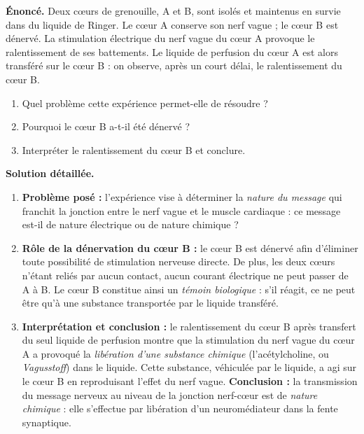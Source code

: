 \documentclass[11pt]{article}
\newcounter{popsec}
\newcounter{popsub}
\newcommand{\courssub}[1]{%
  \stepcounter{popsub}%
  \par\vspace{9pt}\noindent{\popxbold\fontsize{11.5}{13}\selectfont\color{popink}{\color{poporange}\thepopsec.\thepopsub}\hspace{6pt}#1}\par\nopagebreak\vspace{4pt}
}
\begin{document}
\courssub{Exercice résolu}

\begin{exoresolu}
\textbf{Énoncé.} Deux cœurs de grenouille, A et B, sont isolés et maintenus en survie dans du liquide de Ringer. Le cœur A conserve son nerf vague ; le cœur B est dénervé. La stimulation électrique du nerf vague du cœur A provoque le ralentissement de ses battements. Le liquide de perfusion du cœur A est alors transféré sur le cœur B : on observe, après un court délai, le ralentissement du cœur B.
\begin{enumerate}
\item Quel problème cette expérience permet-elle de résoudre ?
\item Pourquoi le cœur B a-t-il été dénervé ?
\item Interpréter le ralentissement du cœur B et conclure.
\end{enumerate}
\tcblower
\textbf{Solution détaillée.}
\begin{enumerate}
\item \textbf{Problème posé :} l'expérience vise à déterminer la \emph{nature du message} qui franchit la jonction entre le nerf vague et le muscle cardiaque : ce message est-il de nature électrique ou de nature chimique ?
\item \textbf{Rôle de la dénervation du cœur B :} le cœur B est dénervé afin d'éliminer toute possibilité de stimulation nerveuse directe. De plus, les deux cœurs n'étant reliés par aucun contact, aucun courant électrique ne peut passer de A à B. Le cœur B constitue ainsi un \emph{témoin biologique} : s'il réagit, ce ne peut être qu'à une substance transportée par le liquide transféré.
\item \textbf{Interprétation et conclusion :} le ralentissement du cœur B après transfert du seul liquide de perfusion montre que la stimulation du nerf vague du cœur A a provoqué la \emph{libération d'une substance chimique} (l'acétylcholine, ou \emph{Vagusstoff}) dans le liquide. Cette substance, véhiculée par le liquide, a agi sur le cœur B en reproduisant l'effet du nerf vague. \textbf{Conclusion :} la transmission du message nerveux au niveau de la jonction nerf-cœur est de \emph{nature chimique} : elle s'effectue par libération d'un neuromédiateur dans la fente synaptique.
\end{enumerate}
\end{exoresolu}
\end{document}
